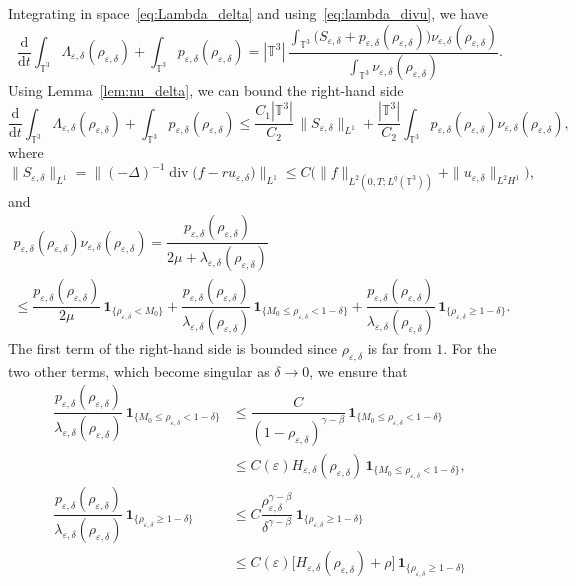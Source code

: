 \documentclass[10pt]{amsart}
\newcommand{\<}{\bigl\langle}
\renewcommand{\>}{\bigr\rangle}
\newcommand{\labeleq}[1]{}
\theoremstyle{definition}
\theoremstyle{remark}
\newcommand{\TT}{\mathbb{T}^3}
\DeclareMathOperator{\Div}{div}
\newcommand{\Dt}{\dfrac{\mathrm{d}}{\mathrm{d} t}}
\let\ep\varepsilon
\begin{document}
Integrating in space~\eqref{eq:Lambda_delta} and using~\eqref{eq:lambda_divu}, we have
\begin{equation*}
\Dt \int_{\TT}{\Lambda_{\ep,\delta}(\rho_{\ep,\delta})} + \int_{\TT}{p_{\ep,\delta}(\rho_{\ep,\delta})}
= |\TT|\,\dfrac{\int_{\TT}{\big(S_{\ep,\delta}+p_{\ep,\delta}(\rho_{\ep,\delta})\big)\nu_{\ep,\delta}(\rho_{\ep,\delta})}}{\int_{\TT}{\nu_{\ep,\delta}(\rho_{\ep,\delta})}}.
\end{equation*}
Using Lemma~\ref{lem:nu_delta}, we can bound the right-hand side
\begin{equation}\label{eq:dt-Lambda-delta}
\Dt \int_{\TT}{\Lambda_{\ep,\delta}(\rho_{\ep,\delta})} + \int_{\TT}{p_{\ep,\delta}(\rho_{\ep,\delta})}
\leq \dfrac{C_1|\TT|}{C_2}\,\|S_{\ep,\delta}\|_{L^1} + \dfrac{|\TT|}{C_2}\int_{\TT}{p_{\ep,\delta}(\rho_{\ep,\delta})\nu_{\ep,\delta}(\rho_{\ep,\delta})},
\end{equation}
where
\[
\|S_{\ep,\delta}\|_{L^1} = \|(-\Delta)^{-1}\Div \big(f-r u_{\ep,\delta}\big) \|_{L^1}
\leq C \big(\|f\|_{L^2(0,T; L^{\bar{q}}(\TT))} + \|u_{\ep,\delta}\|_{L^2H^1}\big),
\]
and
\begin{multline*}
p_{\ep,\delta}(\rho_{\ep,\delta})\nu_{\ep,\delta}(\rho_{\ep,\delta})
= \dfrac{p_{\ep,\delta}(\rho_{\ep,\delta})}{2\mu + \lambda_{\ep,\delta}(\rho_{\ep,\delta})} \\
\leq \dfrac{p_{\ep,\delta}(\rho_{\ep,\delta})}{2\mu}\,\mathbf{1}_{\{\rho_{\ep,\delta} < M_0 \}}
+ \dfrac{p_{\ep,\delta}(\rho_{\ep,\delta})}{\lambda_{\ep,\delta}(\rho_{\ep,\delta})}\,\mathbf{1}_{\{M_0 \leq \rho_{\ep,\delta} < 1-\delta \}}
+ \dfrac{p_{\ep,\delta}(\rho_{\ep,\delta})}{\lambda_{\ep,\delta}(\rho_{\ep,\delta})}\,\mathbf{1}_{\{\rho_{\ep,\delta} \geq 1-\delta \}}.
\end{multline*}
The first term of the right-hand side is bounded since $\rho_{\ep,\delta}$
is far from $1$.
For the two other terms, which become singular as $\delta \rightarrow 0$, we ensure that
\begin{align*}
\dfrac{p_{\ep,\delta}(\rho_{\ep,\delta})}{\lambda_{\ep,\delta}(\rho_{\ep,\delta})}\,\mathbf{1}_{\{M_0 \leq \rho_{\ep,\delta} < 1-\delta \}}
& \leq \dfrac{C}{(1-\rho_{\ep,\delta})^{\gamma-\beta}}\,\mathbf{1}_{\{M_0 \leq \rho_{\ep,\delta} < 1-\delta \}}\\
& \leq C(\ep)H_{\ep,\delta}(\rho_{\ep,\delta})\,\mathbf{1}_{\{M_0 \leq \rho_{\ep,\delta} < 1-\delta \}} \labeleq{estim-p-v0},\\
\dfrac{p_{\ep,\delta}(\rho_{\ep,\delta})}{\lambda_{\ep,\delta}(\rho_{\ep,\delta})}\,\mathbf{1}_{\{\rho_{\ep,\delta} \geq 1-\delta \}}
& \leq C \dfrac{\rho_{\ep,\delta}^{\gamma-\beta}}{\delta^{\gamma-\beta}}\,\mathbf{1}_{\{\rho_{\ep,\delta} \geq 1-\delta \}} \\
& \leq C(\ep)\bigl[H_{\ep,\delta}(\rho_{\ep,\delta})
+ \rho\bigr]\,\mathbf{1}_{\{\rho_{\ep,\delta} \geq 1-\delta \}}
\end{align*}
\end{document}
